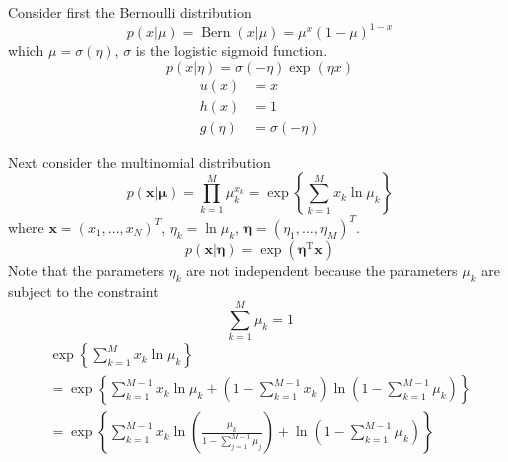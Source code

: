 \documentclass[5p,sort&compress]{elsarticle}
\begin{document}
Consider first the Bernoulli distribution
\begin{equation}
p(x | \mu)=\operatorname{Bern}(x | \mu)=\mu^{x}(1-\mu)^{1-x}
\end{equation}
which $\mu=\sigma(\eta)$, $\sigma$ is the logistic sigmoid function.
\begin{equation}
p(x | \eta)=\sigma(-\eta) \exp (\eta x)
\end{equation}
\begin{equation}
\begin{aligned} u(x) &=x \\ h(x) &=1 \\ g(\eta) &=\sigma(-\eta) \end{aligned}
\end{equation}

Next consider the multinomial distribution
\begin{equation}
p(\mathbf{x} | \boldsymbol{\mu})=\prod_{k=1}^{M} \mu_{k}^{x_{k}}=\exp \left\{\sum_{k=1}^{M} x_{k} \ln \mu_{k}\right\}
\end{equation}
where $\mathbf{x} = (x_1, \ldots, x_N)^T$, $\eta_k = \ln{\mu_k}$, $\boldsymbol{\eta} = (\eta_1, \ldots, \eta_M)^T$.
\begin{equation}
p(\mathbf{x} | \boldsymbol{\eta})=\exp \left(\boldsymbol{\eta}^{\mathrm{T}} \mathbf{x}\right)
\end{equation}
Note that the parameters $\eta_k$ are not independent because the parameters $\mu_k$ are subject to the constraint
\begin{equation}
\sum_{k=1}^{M} \mu_{k}=1
\end{equation}
\begin{equation}
\begin{aligned}{\exp \left\{\sum_{k=1}^{M} x_{k} \ln \mu_{k}\right\}} \\ {=\exp \left\{\sum_{k=1}^{M-1} x_{k} \ln \mu_{k}+\left(1-\sum_{k=1}^{M-1} x_{k}\right) \ln \left(1-\sum_{k=1}^{M-1} \mu_{k}\right)\right\}} \\ {=\exp \left\{\sum_{k=1}^{M-1} x_{k} \ln \left(\frac{\mu_{k}}{1-\sum_{j=1}^{M-1} \mu_{j}}\right)+\ln \left(1-\sum_{k=1}^{M-1} \mu_{k}\right)\right\}}\end{aligned}
\end{equation}
\end{document}
